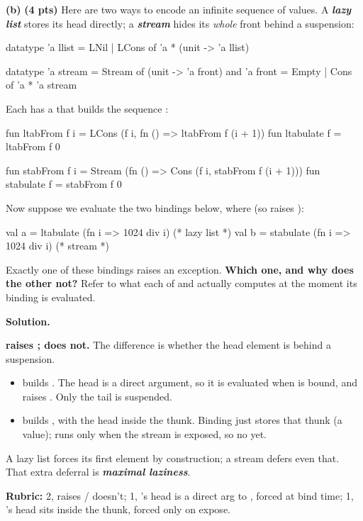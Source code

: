 \documentclass[crop=false]{standalone}
\newif\ifsol
\newenvironment{solution}
    {\par\color{solution_color}\begin{framed}\textbf{Solution.}\par}
    {\end{framed}}
\newcommand{\term}[1]{\textbf{\textit{#1}}}
\newcommand{\subpts}[1]{\textbf{(#1 pts)}}
\newcommand{\answerspace}[1]{\ifsol\else\vspace{#1}\par\fi}
\begin{document}
\textbf{(b)} \subpts{4} Here are two ways to encode an infinite sequence
of values. A \term{lazy list} stores its head directly; a \term{stream}
hides its \emph{whole} front behind a suspension:

\begin{codeblock}
  datatype 'a llist  = LNil | LCons of 'a * (unit -> 'a llist)

  datatype 'a stream = Stream of (unit -> 'a front)
       and 'a front  = Empty  | Cons  of 'a * 'a stream
\end{codeblock}

Each has a  that builds the sequence
:

\begin{codeblock}
  fun ltabFrom f i = LCons (f i, fn () => ltabFrom f (i + 1))
  fun ltabulate f  = ltabFrom f 0

  fun stabFrom f i = Stream (fn () => Cons (f i, stabFrom f (i + 1)))
  fun stabulate f  = stabFrom f 0
\end{codeblock}

Now suppose we evaluate the two bindings below, where  (so  raises ):

\begin{codeblock}
  val a = ltabulate (fn i => 1024 div i)   (* lazy list *)
  val b = stabulate (fn i => 1024 div i)   (* stream    *)
\end{codeblock}

Exactly one of these bindings raises an exception. \textbf{Which one, and
why does the other not?} Refer to what each of  and
 actually computes at the moment its binding is
evaluated.

\answerspace{5.5cm}

\begin{solution}
\textbf{ raises ;  does not.} The difference is
whether the head element is behind a suspension.

\begin{itemize}
  \item {} builds . The head
     is a direct argument, so it is evaluated when  is
    bound, and  raises . Only the tail
    is suspended.
  \item {} builds , with the head  inside the thunk. Binding 
    just stores that thunk (a value);  runs only when the
    stream is exposed, so no  yet.
\end{itemize}

A lazy list forces its first element by construction; a stream defers
even that. That extra deferral is \term{maximal laziness}.

\textbf{Rubric:} 2,  raises /  doesn't; 1, 's
head  is a direct arg to , forced at bind time;
1, 's head sits inside the thunk, forced only on expose.
\end{solution}
\end{document}
